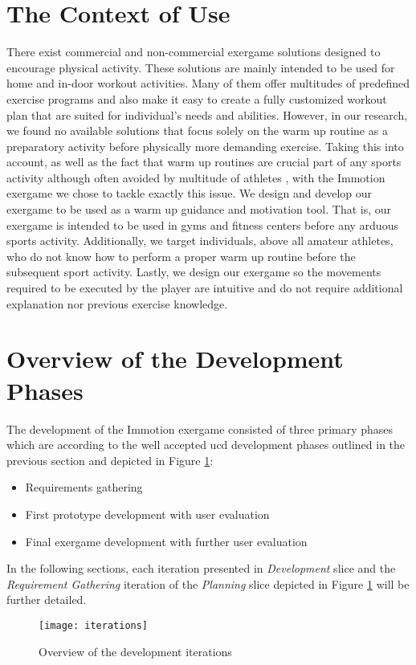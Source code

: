 \section{The Context of Use}
There exist commercial and non-commercial exergame solutions designed to encourage physical activity. These solutions are mainly intended to be used for home and in-door workout activities. Many of them offer multitudes of predefined exercise programs and also make it easy to create a fully customized workout plan that are suited for individual's needs and abilities. However, in our research, we found no available solutions that focus solely on the warm up routine as a preparatory activity before physically more demanding exercise. Taking this into account, as well as the fact that warm up routines are crucial part of any sports activity \cite{bishop2003warm1,shellock1985warming} although often avoided by multitude of athletes \cite{fradkin2006does}, with the Immotion exergame we chose to tackle exactly this issue. We design and develop our exergame to be used as a warm up guidance and motivation tool. That is, our exergame is intended to be used in gyms and fitness centers before any arduous sports activity. Additionally, we target individuals, above all amateur athletes, who do not know how to perform a proper warm up routine before the subsequent sport activity. Lastly, we design our exergame so the movements required to be executed by the player are intuitive and do not require additional explanation nor previous exercise knowledge. \pagebreak
\section{Overview of the Development Phases}
The development of the Immotion exergame consisted of three primary phases which are according to the well accepted \acrshort{ucd} development phases outlined in the previous section and depicted in Figure \ref{fig:iterations}: 
\begin{itemize}
\item Requirements gathering 
\item First prototype development with user evaluation
\item Final exergame development with further user evaluation
\end{itemize}
In the following sections, each iteration presented in \textit{Development} slice and the \textit{Requirement Gathering} iteration of the \textit{Planning} slice depicted in Figure \ref{fig:iterations} will be further detailed. 
\begin{figure}[h]
    \centering
    \texttt{[image: iterations]}
    \caption{Overview of the development iterations}
    \label{fig:iterations}
\end{figure}
